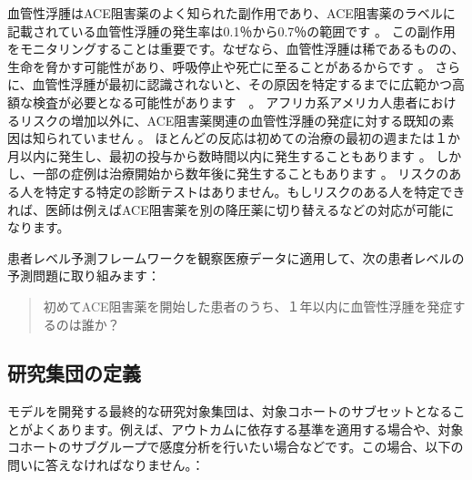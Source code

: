 \documentclass[
  11pt]{book}
\theoremstyle{definition}
\theoremstyle{definition}
\theoremstyle{definition}
\theoremstyle{definition}
\theoremstyle{remark}
\begin{document}
血管性浮腫はACE阻害薬のよく知られた副作用であり、ACE阻害薬のラベルに記載されている血管性浮腫の発生率は0.1％から0.7％の範囲です \citep{byrd_2006}。 この副作用をモニタリングすることは重要です。なぜなら、血管性浮腫は稀であるものの、生命を脅かす可能性があり、呼吸停止や死亡に至ることがあるからです \citep{norman_2013}。 さらに、血管性浮腫が最初に認識されないと、その原因を特定するまでに広範かつ高額な検査が必要となる可能性があります　\citep{norman_2013, thompson_1993}。 アフリカ系アメリカ人患者におけるリスクの増加以外に、ACE阻害薬関連の血管性浮腫の発症に対する既知の素因は知られていません \citep{byrd_2006}。 ほとんどの反応は初めての治療の最初の週または１か月以内に発生し、最初の投与から数時間以内に発生することもあります \citep{circardi_2004}。 しかし、一部の症例は治療開始から数年後に発生することもあります \citep{mara_1996}。 リスクのある人を特定する特定の診断テストはありません。もしリスクのある人を特定できれば、医師は例えばACE阻害薬を別の降圧薬に切り替えるなどの対応が可能になります。  

患者レベル予測フレームワークを観察医療データに適用して、次の患者レベルの予測問題に取り組みます：

\begin{quote}
初めてACE阻害薬を開始した患者のうち、１年以内に血管性浮腫を発症するのは誰か？
\end{quote}

\subsection{研究集団の定義}\label{ux7814ux7a76ux96c6ux56e3ux306eux5b9aux7fa9-1}

モデルを開発する最終的な研究対象集団は、対象コホートのサブセットとなることがよくあります。例えば、アウトカムに依存する基準を適用する場合や、対象コホートのサブグループで感度分析を行いたい場合などです。この場合、以下の問いに答えなければなりません。：
\end{document}
